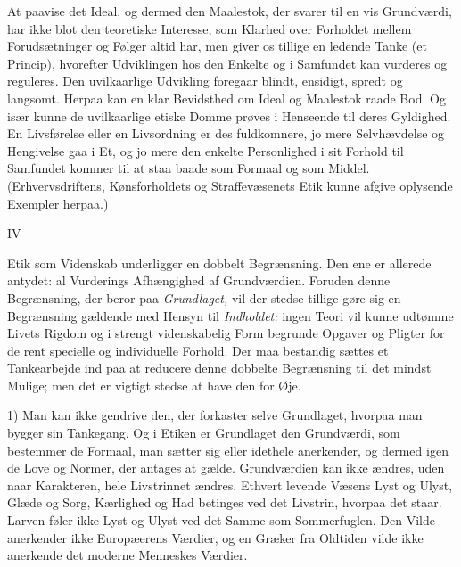 \documentclass[12pt,a4paper,openany]{book}
\newcommand{\opage}[1]{\marginnote{\footnotesize\textit{[#1]}}}
\begin{document}
At paavise det Ideal, og dermed den Maalestok, der svarer
til en vis Grundværdi, har ikke blot den teoretiske Interesse,
som Klarhed over Forholdet mellem Forudsætninger og Følger
altid har, men giver os tillige en ledende Tanke (et Princip),
hvorefter Udviklingen hos den Enkelte og i Samfundet kan vurderes
og reguleres. Den uvilkaarlige Udvikling foregaar blindt,
ensidigt, spredt og langsomt. Herpaa kan en klar Bevidsthed om
Ideal og Maalestok raade Bod. Og især kunne de uvilkaarlige
etiske Domme prøves i Henseende til deres Gyldighed. En Livsførelse
eller en Livsordning er des fuldkomnere, jo mere Selvhævdelse
og Hengivelse gaa i Et, og jo mere den enkelte Personlighed
i sit Forhold til Samfundet kommer til at staa baade
som Formaal og som Middel. (Erhvervsdriftens, Kønsforholdets
og Straffevæsenets Etik kunne afgive oplysende Exempler herpaa.)

\begin{center}IV\end{center}


Etik som Videnskab underligger en dobbelt Begrænsning.
Den ene er allerede antydet: al Vurderings Afhængighed af
Grundværdien. Foruden denne Begrænsning, der beror paa
\textit{Grundlaget,} vil der stedse tillige gøre sig en Begrænsning gældende
med Hensyn til \textit{Indholdet:} ingen Teori vil kunne udtømme
Livets Rigdom og i strengt videnskabelig Form begrunde Opgaver
og Pligter for de rent specielle og individuelle Forhold.
Der maa bestandig sættes et Tankearbejde ind paa at reducere
denne dobbelte Begrænsning til det mindst Mulige; men det er
vigtigt stedse at have den for Øje.

1) Man kan ikke gendrive den, der forkaster selve Grundlaget,
hvorpaa man bygger sin Tankegang. Og i Etiken er Grundlaget
den Grundværdi, som bestemmer de Formaal, man sætter
sig eller idethele anerkender, og dermed igen de Love og
Normer, der antages at gælde. Grundværdien kan ikke ændres,
uden naar Karakteren, hele Livstrinnet ændres. Ethvert levende
\setcounter{footnote}{0}%
\opage{62}Væsens Lyst og Ulyst, Glæde og Sorg, Kærlighed og Had betinges
ved det Livstrin, hvorpaa det staar. Larven føler ikke
Lyst og Ulyst ved det Samme som Sommerfuglen. Den Vilde
anerkender ikke Europæerens Værdier, og en Græker fra Oldtiden
vilde ikke anerkende det moderne Menneskes Værdier.
\end{document}

